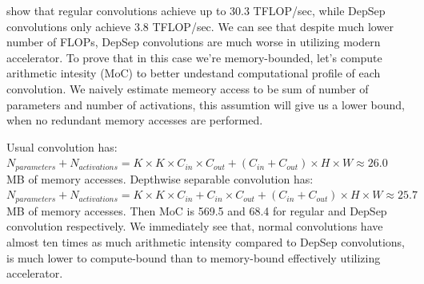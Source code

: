 % 

% 

show that regular convolutions achieve up to 30.3 TFLOP/sec, while DepSep convolutions only achieve 3.8 TFLOP/sec. We can see that despite much lower number of FLOPs, DepSep convolutions are much worse in utilizing modern accelerator. To prove that in this case we're memory-bounded, let's compute arithmetic intesity (MoC) to better undestand computational profile of each convolution. We naively estimate memeory access to be sum of number of parameters and number of activations, this assumtion will give us a lower bound, when no redundant memory accesses are performed. 

Usual convolution has: $ N_{parameters} + N_{activations} = K \times K \times C_{in} \times C_{out} + (C_{in} + C_{out}) \times H \times W \approx 26.0$ MB of memory accesses. Depthwise separable convolution has: $ N_{parameters} + N_{activations} = K \times K \times C_{in} + C_{in} \times C_{out} + (C_{in} + C_{out}) \times H \times W \approx 25.7$ MB of memory accesses. Then MoC is 569.5 and 68.4 for regular and DepSep convolution respectively. We immediately see that, normal convolutions have almost ten times as much arithmetic intensity compared to DepSep convolutions, is much lower to compute-bound than to memory-bound effectively utilizing accelerator. 

